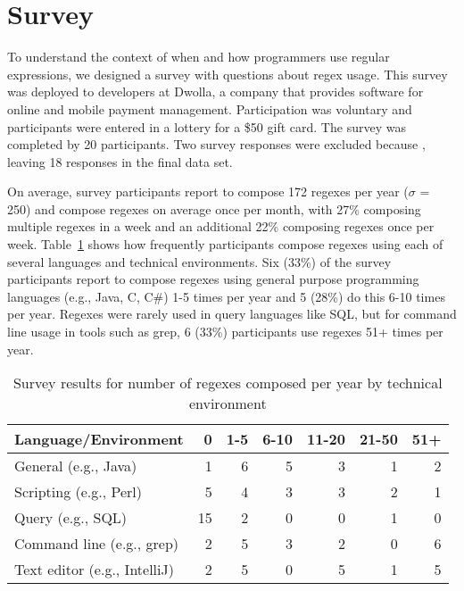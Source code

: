 \section{Survey}
\label{sec:survey}

To understand the context of when and how programmers use regular expressions, 
we designed a survey with  questions about regex usage. This survey was 
deployed to developers at Dwolla, a company that provides software for
 online and mobile payment management. 
Participation was voluntary and participants were entered in a lottery for a \$50 gift card. 
The survey was completed by 20 participants. Two survey responses were excluded
because , leaving 18 responses in the final data set. 


On average, survey participants report to compose 172 regexes per year ($\sigma$ = 250) and compose regexes on average once per month, with 27\% composing multiple regexes in a week and an additional 22\% composing regexes once per week. 
Table~\ref{tab:regexenviron} shows how frequently participants compose regexes using each of several languages and technical environments. 
Six (33\%) of the survey participants report to compose regexes using general purpose programming languages (e.g., Java, C, C\#) 1-5 times per year and 5 (28\%) do this 6-10 times per year.  Regexes were rarely used in query languages like SQL, but for command line usage in tools such as grep, 6 (33\%) participants use regexes 51+ times per year. 

\newcommand{\horiz}{\hspace{2.1pt}}

\begin{table}
\caption{Survey results for number of regexes composed per year by technical environment \label{tab:regexenviron}}
\begin{center}
\begin{small}
\begin{tabular}{l | r @{  \horiz} r @{ \horiz } r @{ \horiz } r @{ \horiz } r @{ \horiz } r }
Language/Environment & 0 & 1-5 & 6-10 & 11-20 & 21-50 & 51+ \\ \hline
General  (e.g., Java)  & 1 & 6 & 5 & 3& 1& 2 \\
Scripting  (e.g., Perl) &5 &4 &3 &3 &2  &1 \\
Query  (e.g., SQL) & 15&2 &0 &0 &1  & 0\\
Command line (e.g., grep)   &2 &5 &3 &2 &0  &6 \\
Text editor (e.g., IntelliJ)   & 2& 5& 0& 5& 1& 5\\
\end{tabular}
\end{small}
\end{center}
\end{table}

